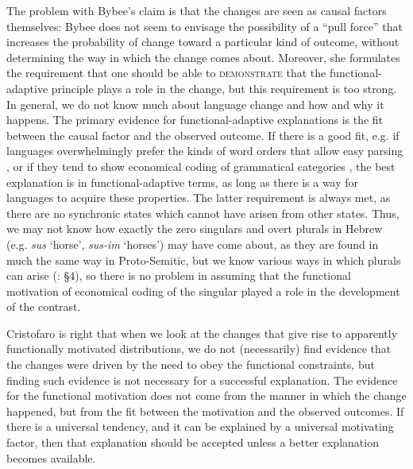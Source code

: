 \documentclass[output=paper]{langsci/langscibook}
\begin{document}
The problem with Bybee’s claim is that the changes are seen as causal factors themselves: Bybee does not seem to envisage the possibility of a “pull force” that increases the probability of change toward a particular kind of outcome, without determining the way in which the change comes about. Moreover, she formulates the requirement that one should be able to \textsc{demonstrate} that the functional-adaptive principle plays a role in the change, but this requirement is too strong. In general, we do not know much about language change and how and why it happens. The primary evidence for functional-adaptive explanations is the fit between the causal factor and the observed outcome. If there is a good fit, e.g. if languages overwhelmingly prefer the kinds of word orders that allow easy parsing \citep{Hawkins2014}, or if they tend to show economical coding of grammatical categories \citep{Haspelmath2008}, the best explanation is in functional-adaptive terms, as long as there is a way for languages to acquire these properties. The latter requirement is always met, as there are no synchronic states which cannot have arisen from other states. Thus, we may not know how exactly the zero singulars and overt plurals in Hebrew (e.g. \textit{sus} ‘horse’, \textit{sus-im} ‘horses’) may have come about, as they are found in much the same way in Proto-Semitic, but we know various ways in which plurals can arise (\citealt{Cristofaro2013}: §4), so there is no problem in assuming that the functional motivation of economical coding of the singular played a role in the development of the contrast.

Cristofaro is right that when we look at the changes that give rise to apparently functionally motivated distributions, we do not (necessarily) find evidence that the changes were driven by the need to obey the functional constraints, but finding such evidence is not necessary for a successful explanation. The evidence for the functional motivation does not come from the manner in which the change happened, but from the fit between the motivation and the observed outcomes. If there is a universal tendency, and it can be explained by a universal motivating factor, then that explanation should be accepted unless a better explanation becomes available.
\end{document}
